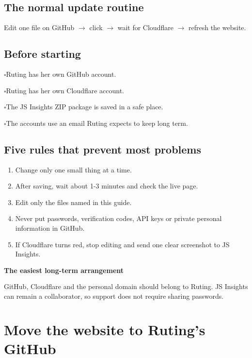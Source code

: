 \documentclass[10pt,a4paper]{article}
\newcommand{\button}[1]{\tcbox[on line,colback=DeepNavy,colframe=DeepNavy,coltext=white,boxrule=0pt,arc=1.2mm,left=2mm,right=2mm,top=0.7mm,bottom=0.7mm]{\sffamily\bfseries\scriptsize #1}}
\newcommand{\checkline}[1]{\(\square\)\hspace{0.5em}#1}
\begin{document}
\subsection{The normal update routine}

\begin{tcolorbox}[gold]
Edit one file on GitHub \(\rightarrow\) click \button{Commit changes} \(\rightarrow\) wait for Cloudflare \(\rightarrow\) refresh the website.
\end{tcolorbox}

\subsection{Before starting}

\checkline{Ruting has her own GitHub account.}\par
\checkline{Ruting has her own Cloudflare account.}\par
\checkline{The JS Insights ZIP package is saved in a safe place.}\par
\checkline{The accounts use an email Ruting expects to keep long term.}

\subsection{Five rules that prevent most problems}

\begin{enumerate}
  \item Change only one small thing at a time.
  \item After saving, wait about 1-3 minutes and check the live page.
  \item Edit only the files named in this guide.
  \item Never put passwords, verification codes, API keys or private personal information in GitHub.
  \item If Cloudflare turns red, stop editing and send one clear screenshot to JS Insights.
\end{enumerate}

\begin{tcolorbox}[quiet]
\textbf{The easiest long-term arrangement}\par
GitHub, Cloudflare and the personal domain should belong to Ruting. JS Insights can remain a collaborator, so support does not require sharing passwords.
\end{tcolorbox}

\clearpage
\section{Move the website to Ruting's GitHub}
\end{document}
